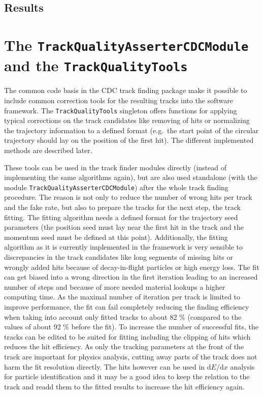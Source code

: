 \subsection{Results}


\section{The \texttt{Track\-Quality\-Asserter\-CDC\-Module} and the \texttt{Track\-Quality\-Tools}}  \label{section-quality}

The common code basis in the CDC track finding package make it possible to include common correction tools for the resulting tracks into the software framework. The \texttt{Track\-Quality\-Tools} singleton offers functions for applying typical corrections on the track candidates like removing of hits or normalizing the trajectory information to a defined format (e.g.\ the start point of the circular trajectory should lay on the position of the first hit). The different implemented methods are described later.

These tools can be used in the track finder modules directly (instead of implementing the same algorithms again), but are also used standalone (with the module \texttt{Track\-Quality\-Asserter\-CDC\-Module}) after the whole track finding procedure. The reason is not only to reduce the number of wrong hits per track and the fake rate, but also to prepare the tracks for the next step, the track fitting. The fitting algorithm needs a defined format for the trajectory seed parameters (the position seed must lay near the first hit in the track and the momentum seed must be defined at this point). Additionally, the fitting algorithm as it is currently implemented in the framework is very sensible to discrepancies in the track candidates like long segments of missing hits or wrongly added hits because of decay-in-flight particles or high energy loss. The fit can get biased into a wrong direction in the first iteration leading to an increased number of steps and because of more needed material lookups a higher computing time. As the maximal number of iteration per track is limited to improve performance, the fit can fail completely reducing the finding efficiency when taking into account only fitted tracks to about 82 \% (compared to the values of about 92 \% before the fit). To increase the number of successful fits, the tracks can be edited to be suited for fitting including the clipping of hits which reduces the hit efficiency. As only the tracking parameters at the front of the track are important for physics analysis, cutting away parts of the track does not harm the fit resolution directly. The hits however can be used in $\mathrm d E/\mathrm d x$ analysis for particle identification and it may be a good idea to keep the relation to the track and readd them to the fitted results to increase the hit efficiency again. 

